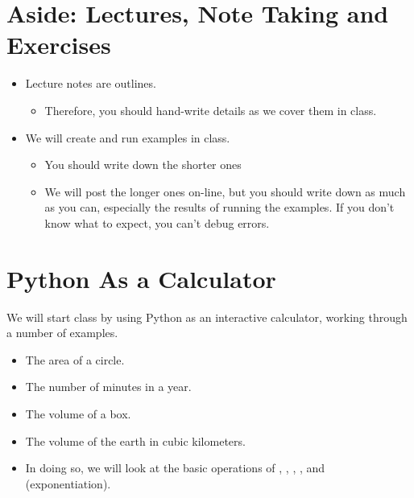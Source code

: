 \documentclass[letterpaper,10pt,english]{sphinxmanual}
\begin{document}
\section{Aside: Lectures, Note Taking and Exercises}
\label{\detokenize{lecture_notes/lec02_calculator:aside-lectures-note-taking-and-exercises}}\begin{itemize}
\item {} 
Lecture notes are outlines.
\begin{itemize}
\item {} 
Therefore, you should hand-write details as we cover them in
class.

\end{itemize}

\item {} 
We will create and run examples in class.
\begin{itemize}
\item {} 
You should write down the shorter ones

\item {} 
We will post the longer ones on-line, but you should write down as
much as you can, especially the results of running the
examples. If you don’t know what to expect, you can’t debug errors.

\end{itemize}

\end{itemize}


\section{Python As a Calculator}
\label{\detokenize{lecture_notes/lec02_calculator:python-as-a-calculator}}
We will start class by using Python as an interactive calculator,
working through a number of examples.
\begin{itemize}
\item {} 
The area of a circle.

\item {} 
The number of minutes in a year.

\item {} 
The volume of a box.

\item {} 
The volume of the earth in cubic kilometers.

\item {} 
In doing so, we will look at the basic operations of \sphinxcode{\sphinxupquote{+}}, \sphinxcode{\sphinxupquote{-}}, \sphinxcode{\sphinxupquote{*}}, \sphinxcode{\sphinxupquote{/}},
and \sphinxcode{\sphinxupquote{**}} (exponentiation).

\end{itemize}
\end{document}
